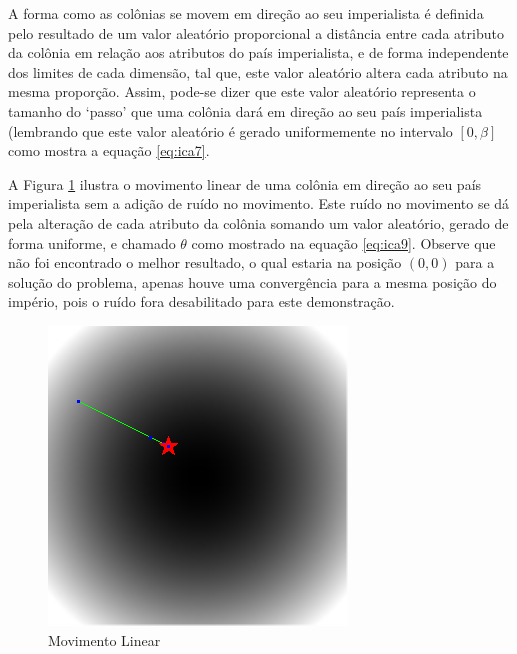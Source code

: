 A forma como as colônias se movem em direção ao seu imperialista é definida pelo resultado de um valor aleatório proporcional a distância entre cada atributo da colônia em relação aos atributos do país imperialista, e de forma independente dos limites de cada dimensão, tal que, este valor aleatório altera cada atributo na mesma proporção. Assim, pode-se dizer que este valor aleatório representa o tamanho do ‘passo’ que uma colônia dará em direção ao seu país imperialista (lembrando que este valor aleatório é gerado uniformemente no intervalo \(\left[0,\beta\right]\) como mostra a equação \ref{eq:ica7}.


A Figura \ref{fig:Movimento_Linear} ilustra o movimento linear de uma colônia em direção ao seu país imperialista sem a adição de ruído no movimento. Este ruído no movimento se dá pela alteração de cada atributo da colônia somando um valor aleatório, gerado de forma uniforme, e chamado \(\theta\) como mostrado na equação \ref{eq:ica9}. Observe que não foi encontrado o melhor resultado, o qual estaria na posição \((0,0)\) para a solução do problema, apenas houve uma convergência para a mesma posição do império, pois o ruído fora desabilitado para este demonstração.

\begin{figure}[h]
	\centering
	\includegraphics[scale=1]{Figuras/Movimento_Linear.png}
	\caption{Movimento Linear }
	\label{fig:Movimento_Linear}
\end{figure}

